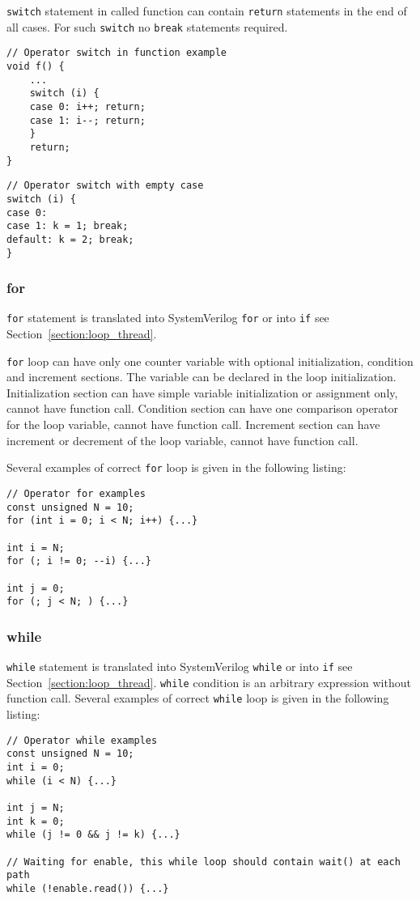 {\tt switch} statement in called function can contain {\tt return} statements in the end of all cases. For such {\tt switch} no {\tt break} statements required.

\begin{lstlisting}[style=mycpp]
// Operator switch in function example
void f() {
    ...
    switch (i) {
    case 0: i++; return;
    case 1: i--; return;
    }
    return;
}
\end{lstlisting}


\begin{lstlisting}[style=mycpp]
// Operator switch with empty case
switch (i) {
case 0: 
case 1: k = 1; break;
default: k = 2; break;
}
\end{lstlisting}


\subsubsection{for}

{\tt for} statement is translated into SystemVerilog {\tt for} or into {\tt if} see Section~\ref{section:loop_thread}. 

{\tt for} loop can have only one counter variable with optional initialization, condition and increment sections. The variable can be declared in the loop initialization. 
Initialization section can have simple variable initialization or assignment only, cannot have function call.
Condition section can have one comparison operator for the loop variable, cannot have function call.
Increment section can have increment or decrement of the loop variable, cannot have function call. 

Several examples of correct {\tt for} loop is given in the following listing:
%
\begin{lstlisting}[style=mycpp]
// Operator for examples
const unsigned N = 10;
for (int i = 0; i < N; i++) {...}

int i = N;
for (; i != 0; --i) {...}

int j = 0;
for (; j < N; ) {...}
\end{lstlisting}

\subsubsection{while}

{\tt while} statement is translated into SystemVerilog {\tt while} or into {\tt if} see Section~\ref{section:loop_thread}.
{\tt while} condition is an arbitrary expression without function call.
Several examples of correct {\tt while} loop is given in the following listing:
%
\begin{lstlisting}[style=mycpp]
// Operator while examples
const unsigned N = 10;
int i = 0;
while (i < N) {...}

int j = N;
int k = 0;
while (j != 0 && j != k) {...}

// Waiting for enable, this while loop should contain wait() at each path
while (!enable.read()) {...}
\end{lstlisting}


